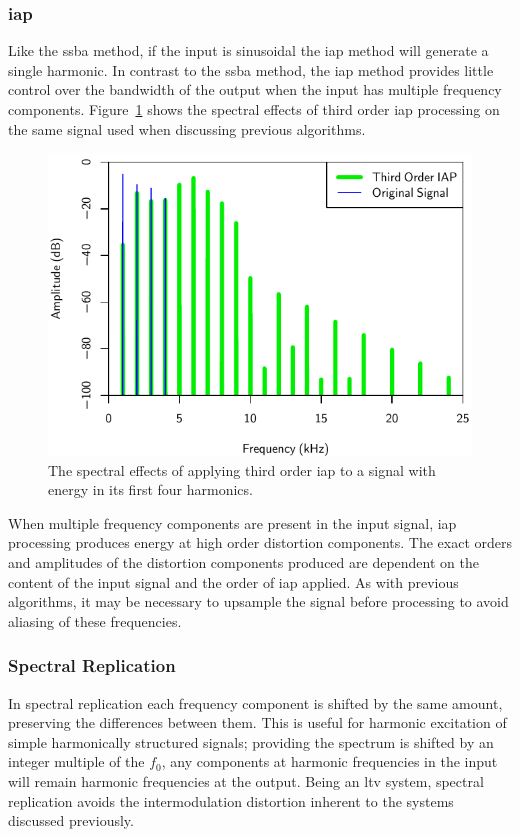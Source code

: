 		\subsubsection*{\acrshort{iap}}
			Like the \acrshort{ssba} method, if the input is sinusoidal the \acrshort{iap} method will generate
			a single harmonic. In contrast to the \acrshort{ssba} method, the \acrshort{iap} method provides
			little control over the bandwidth of the output when the input has multiple frequency components.
			Figure~\ref{fig:IAP3Spectra} shows the spectral effects of third order \acrshort{iap} processing on
			the same signal used when discussing previous algorithms.

			\begin{figure}[h!]
				\centering
				\includegraphics{chapter5/Images/IAP3Spectra.pdf}
				\caption{The spectral effects of applying third order \acrshort{iap} to a signal with
					 energy in its first four harmonics.}
				\label{fig:IAP3Spectra}
			\end{figure}

			When multiple frequency components are present in the input signal, \acrshort{iap} processing
			produces energy at high order distortion components. The exact orders and amplitudes of the
			distortion components produced are dependent on the content of the input signal and the order of
			\acrshort{iap} applied. As with previous algorithms, it may be necessary to upsample the signal
			before processing to avoid aliasing of these frequencies.

		\subsubsection*{Spectral Replication}
			In spectral replication each frequency component is shifted by the same amount, preserving the
			differences between them. This is useful for harmonic excitation of simple harmonically structured
			signals; providing the spectrum is shifted by an integer multiple of the $f_{0}$, any components at
			harmonic frequencies in the input will remain harmonic frequencies at the output. Being an
			\acrshort{ltv} system, spectral replication avoids the intermodulation distortion inherent to the
			systems discussed previously. 

